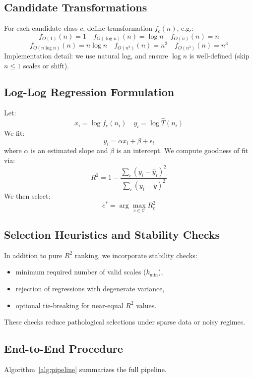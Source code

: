 \documentclass[conference]{IEEEtran}
\begin{document}
\subsection{Candidate Transformations}

For each candidate class $c$, define transformation $f_c(n)$, e.g.:
\[
f_{O(1)}(n) = 1
\quad
f_{O(\log n)}(n) = \log n
\quad
f_{O(n)}(n) = n
\]
\[
f_{O(n\log n)}(n) = n \log n
\quad
f_{O(n^2)}(n) = n^2
\quad
f_{O(n^3)}(n) = n^3
\]
Implementation detail:
we use natural log, and ensure $\log n$ is well-defined (skip $n\le1$ scales or
shift).

\subsection{Log-Log Regression Formulation}

Let:
\[
x_i = \log f_c(n_i)
\quad
y_i = \log \hat{T}(n_i)
\]
We fit:
\[
y_i = \alpha x_i + \beta + \epsilon_i
\]
where $\alpha$ is an estimated slope and $\beta$ is an intercept.
We compute goodness of fit via:
\[
R^2
=
1
-
\frac{\sum_i (y_i - \hat{y}_i)^2}{\sum_i (y_i - \bar{y})^2}
\]
We then select:
\[
c^{*} = \arg\max_{c \in \mathcal{C}} R^2_c
\]

\subsection{Selection Heuristics and Stability Checks}

In addition to pure $R^2$ ranking, we incorporate stability checks:
\begin{itemize}[leftmargin=1.2em]
\item minimum required number of valid scales ($k_{\min}$),
\item rejection of regressions with degenerate variance,
\item optional tie-breaking for near-equal $R^2$ values.
\end{itemize}
These checks reduce pathological selections under sparse data or noisy regimes.

\subsection{End-to-End Procedure}

Algorithm~\ref{alg:pipeline} summarizes the full pipeline.
\end{document}
